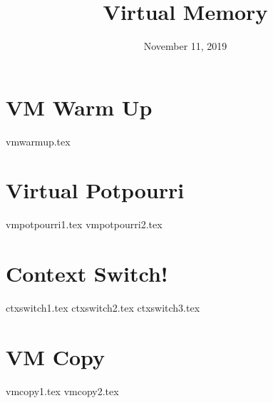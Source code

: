\documentclass[11pt]{exam}
\title{Virtual Memory}
\date{November 11, 2019}
\begin{document}
\maketitle

\section{VM Warm Up}
\begin{questions}
{vmwarmup.tex}
\end{questions}
\newpage

\section{Virtual Potpourri}
\begin{questions}
{vmpotpourri1.tex}
{vmpotpourri2.tex}
\end{questions}
\newpage

\section{Context Switch!}
\begin{questions}
{ctxswitch1.tex}
{ctxswitch2.tex}
{ctxswitch3.tex}
\end{questions}
\newpage

\section{VM Copy}
\begin{questions}
{vmcopy1.tex}
{vmcopy2.tex}
\end{questions}
\end{document}
